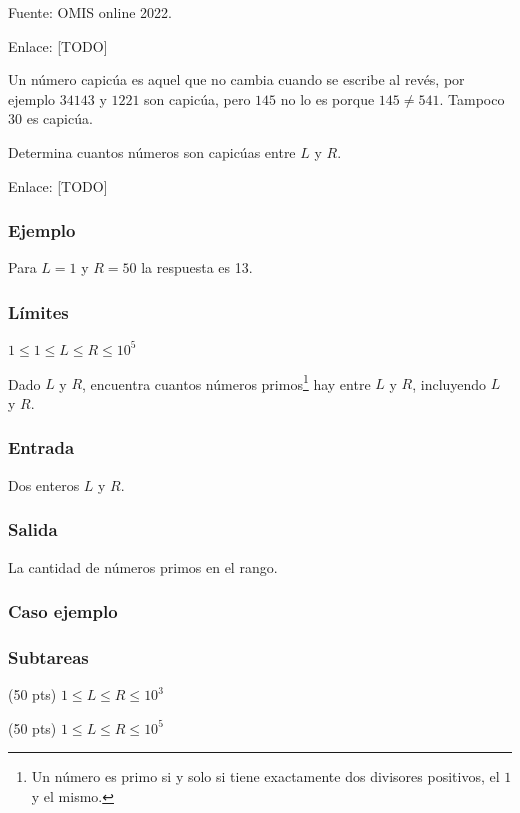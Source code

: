 Fuente: OMIS online 2022.

Enlace: [TODO]

\problembreak

\problemtitle Un número capicúa es aquel que no cambia cuando se escribe al revés, por ejemplo \(34143\) y \(1221\) son capicúa, pero \(145\) no lo es porque \(145\neq 541\). Tampoco \(30\) es capicúa.

Determina cuantos números son capicúas entre \(L\) y \(R\).

Enlace: [TODO]
\subsubsection*{Ejemplo}
Para \(L=1\) y \(R=50\) la respuesta es 13.
\subsubsection*{Límites}
\(1 \leq 1  \leq L \leq R \leq 10^5 \)


\problembreak

\problemtitle Dado \(L\) y \(R\), encuentra cuantos números primos\footnote{Un número es primo si y solo si tiene exactamente dos divisores positivos, el \(1\) y el mismo.} hay entre \(L\) y \(R\), incluyendo \(L\) y \(R\).
 

\subsubsection*{Entrada}
Dos enteros \(L\) y \(R\).
\subsubsection*{Salida}
La cantidad de números primos en el rango.
\subsubsection{Caso ejemplo}
\begin{casebox3}
\end{casebox3}

\subsubsection*{Subtareas}
\begin{plimits}
	\item (50 pts) \(1\leq L\leq R\leq 10^3\)
	\item (50 pts) \(1\leq L\leq R\leq 10^5\)
\end{plimits}

